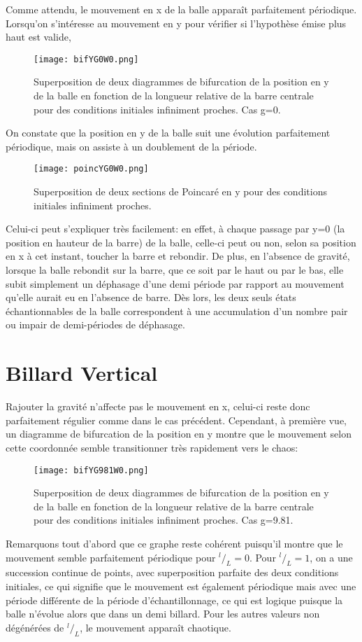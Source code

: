\documentclass[a4paper]{report}
\begin{document}
Comme attendu, le mouvement en x de la balle apparaît parfaitement périodique. Lorsqu'on s'intéresse au mouvement en y pour vérifier si l'hypothèse émise plus haut est valide,
\begin{figure}[h!]
   \texttt{[image: bifYG0W0.png]}
      \caption[Diagramme de bifurcation en y: g=0 ]{Superposition de deux diagrammes de bifurcation de la position en y de la balle en fonction de la longueur relative de la barre centrale pour des conditions initiales infiniment proches. Cas g=0.}
\end{figure}
On constate que la position en y de la balle suit une évolution parfaitement périodique, mais on assiste à un doublement de la période.
\begin{figure}[H]
   \texttt{[image: poincYG0W0.png]}
      \caption[Section de Poincaré en y: g=0 ]{Superposition de deux sections de Poincaré en y pour des conditions initiales infiniment proches.}
\end{figure}

Celui-ci peut s'expliquer très facilement: en effet, à chaque passage par y=0 (la position en hauteur de la barre) de la balle, celle-ci peut ou non, selon sa position en x à cet instant, toucher la barre et rebondir. De plus, en l'absence de gravité, lorsque la balle rebondit sur la barre, que ce soit par le haut ou par le bas, elle subit simplement un déphasage d'une demi période par rapport au mouvement qu'elle aurait eu en l'absence de barre. Dès lors, les deux seuls états échantionnables de la balle correspondent à une accumulation d'un nombre pair ou impair de demi-périodes de déphasage.

\section{Billard Vertical}
Rajouter la gravité n'affecte pas le mouvement en x, celui-ci reste donc parfaitement régulier comme dans le cas précédent. Cependant, à première vue, un diagramme de bifurcation de la position en y montre que le mouvement selon cette coordonnée semble transitionner très rapidement vers le chaos:
\begin{figure}[h]
   \texttt{[image: bifYG981W0.png]}
      \caption[Diagramme de Bifurcation en y: g=9.81 \(\omega=0\)]{Superposition de deux diagrammes de bifurcation de la position en y de la balle en fonction de la longueur relative de la barre centrale pour des conditions initiales infiniment proches. Cas g=9.81.}
\end{figure}
Remarquons tout d'abord que ce graphe reste cohérent puisqu'il montre que le mouvement semble parfaitement périodique pour \(^l/_L=0\). Pour \(^l/_L=1\), on a une succession continue de points, avec superposition parfaite des deux conditions initiales, ce qui signifie que le mouvement est également périodique mais avec une période différente de la période d'échantillonnage, ce qui est logique puisque la balle n'évolue alors que dans un demi billard. Pour les autres valeurs non dégénérées de \(^l/_L\), le mouvement apparaît chaotique.
\end{document}
